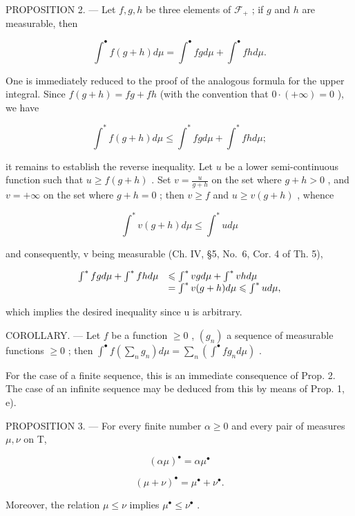 PROPOSITION 2. --- Let \(f,g,h\) be three elements of \(\mathcal{F}_{+}\) ; if \(g\) and \(h\) are measurable, then

\[
\int^ {\bullet} f (g + h) d \mu = \int^ {\bullet} f g d \mu + \int^ {\bullet} f h d \mu .\tag{2}
\]

One is immediately reduced to the proof of the analogous formula for the upper integral. Since \(f(g + h) = fg + fh\) (with the convention that \(0 \cdot (+\infty) = 0\) ), we have

\[
\int^ {*} f (g + h) d \mu \leqslant \int^ {*} f g d \mu + \int^ {*} f h d \mu ;
\]

it remains to establish the reverse inequality. Let \(u\) be a lower semi-continuous function such that \(u \geqslant f(g + h)\) . Set \(v = \frac{u}{g + h}\) on the set where \(g + h > 0\) , and \(v = +\infty\) on the set where \(g + h = 0\) ; then \(v \geqslant f\) and \(u \geqslant v(g + h)\) , whence

\[
\int^ {*} v (g + h) d \mu \leqslant \int^ {*} u d \mu
\]

and consequently, v being measurable (Ch. IV, §5, No.~6, Cor. 4 of Th. 5),

\[
\begin{array}{r l} \int^ {*} f g d \mu + \int^ {*} f h d \mu & \leqslant \int^ {*} v g d \mu + \int^ {*} v h d \mu \\ & = \int^ {*} v (g + h) d \mu \leqslant \int^ {*} u d \mu , \end{array}
\]

which implies the desired inequality since u is arbitrary.

COROLLARY. --- Let \(f\) be a function \(\geqslant 0\) , \((g_n)\) a sequence of measurable functions \(\geqslant 0\) ; then \(\int^{\bullet} f\left(\sum_{n} g_n\right) d\mu = \sum_{n} \left(\int^{\bullet} fg_n d\mu\right)\) .

For the case of a finite sequence, this is an immediate consequence of Prop. 2. The case of an infinite sequence may be deduced from this by means of Prop. 1, e).

PROPOSITION 3. --- For every finite number \(\alpha \geqslant 0\) and every pair of measures \(\mu, \nu\) on T,

\[
(\alpha \mu) ^ {\bullet} = \alpha \mu^ {\bullet}
\]

\[
(\mu + \nu) ^ {\bullet} = \mu^ {\bullet} + \nu^ {\bullet}.
\]

Moreover, the relation \(\mu \leqslant \nu\) implies \(\mu^{\bullet} \leqslant \nu^{\bullet}\) .

